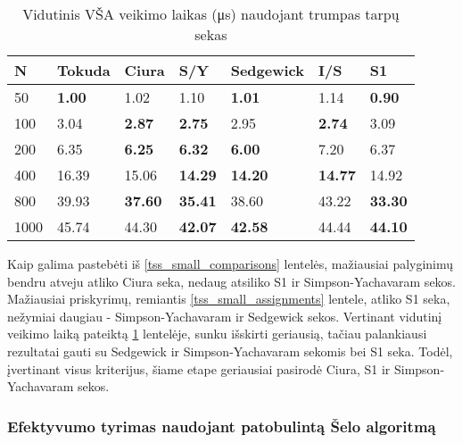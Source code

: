 \documentclass{VUMIFInfKursinis}
\begin{document}
\begin{table}[H]
  \caption{Vidutinis VŠA veikimo laikas (μs) naudojant trumpas tarpų sekas}
  \label{tss_small_runtimes}
  \begin{tabular}{|l|l|l|l|l|l|l|}
  \hline
  N    & Tokuda        & Ciura          & S/Y            & Sedgewick      & I/S            & S1             \\ \hline
  50   & \textbf{1.00} & 1.02           & 1.10           & \textbf{1.01}  & 1.14           & \textbf{0.90}  \\ \hline
  100  & 3.04          & \textbf{2.87}  & \textbf{2.75}  & 2.95           & \textbf{2.74}  & 3.09           \\ \hline
  200  & 6.35          & \textbf{6.25}  & \textbf{6.32}  & \textbf{6.00}  & 7.20           & 6.37           \\ \hline
  400  & 16.39         & 15.06          & \textbf{14.29} & \textbf{14.20} & \textbf{14.77} & 14.92          \\ \hline
  800  & 39.93         & \textbf{37.60} & \textbf{35.41} & 38.60          & 43.22          & \textbf{33.30} \\ \hline
  1000 & 45.74         & 44.30          & \textbf{42.07} & \textbf{42.58} & 44.44          & \textbf{44.10} \\ \hline
  \end{tabular}
  \end{table}

Kaip galima pastebėti iš \ref{tss_small_comparisons} lentelės, mažiausiai palyginimų bendru atveju atliko Ciura seka,
nedaug atsiliko S1 ir Simpson-Yachavaram sekos. Mažiausiai priskyrimų, remiantis \ref{tss_small_assignments} lentele, atliko S1 seka, nežymiai daugiau - Simpson-Yachavaram ir Sedgewick sekos.
Vertinant vidutinį veikimo laiką pateiktą \ref{tss_small_runtimes} lentelėje, sunku išskirti geriausią,
tačiau palankiausi rezultatai gauti su Sedgewick ir Simpson-Yachavaram sekomis bei S1 seka.
Todėl, įvertinant visus kriterijus, šiame etape geriausiai pasirodė Ciura, S1 ir Simpson-Yachavaram sekos.

\subsubsection{Efektyvumo tyrimas naudojant patobulintą Šelo algoritmą}
\end{document}
